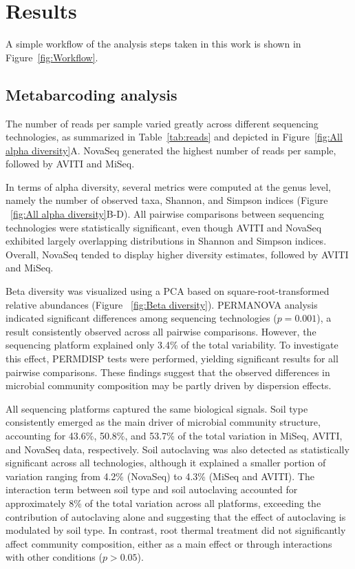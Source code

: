 \documentclass[12pt]{article}
\theoremstyle{thmstyleone}%
\theoremstyle{thmstyletwo}%
\theoremstyle{thmstylethree}%
\begin{document}
\section{Results}\label{sec2}
A simple workflow of the analysis steps taken in this work is shown in Figure~\ref{fig:Workflow}.



\subsection{Metabarcoding analysis}
The number of reads per sample varied greatly across different sequencing technologies, as summarized in Table~\ref{tab:reads} and depicted in Figure~\ref{fig:All alpha diversity}A. NovaSeq generated the highest number of reads per sample, followed by AVITI and MiSeq. 

In terms of alpha diversity, several metrics were computed at the genus level, namely the number of observed taxa, Shannon, and Simpson indices (Figure ~\ref{fig:All alpha diversity}B-D). All pairwise comparisons between sequencing technologies were statistically significant, even though AVITI and NovaSeq exhibited largely overlapping distributions in Shannon and Simpson indices. Overall, NovaSeq tended to display higher diversity estimates, followed by AVITI and MiSeq.

Beta diversity was visualized using a PCA based on square-root-transformed relative abundances (Figure ~\ref{fig:Beta diversity}). PERMANOVA analysis indicated significant differences among sequencing technologies ($p = 0.001$), a result consistently observed across all pairwise comparisons. However, the sequencing platform explained only 3.4\% of the total variability. To investigate this effect, PERMDISP tests were performed, yielding significant results for all pairwise comparisons. These findings suggest that the observed differences in microbial community composition may be partly driven by dispersion effects.

All sequencing platforms captured the same biological signals. Soil type consistently emerged as the main driver of microbial community structure, accounting for 43.6\%, 50.8\%, and 53.7\% of the total variation in MiSeq, AVITI, and NovaSeq data, respectively. Soil autoclaving was also detected as statistically significant across all technologies, although it explained a smaller portion of variation ranging from 4.2\% (NovaSeq) to 4.3\% (MiSeq and AVITI). The interaction term between soil type and soil autoclaving accounted for approximately 8\% of the total variation across all platforms, exceeding the contribution of autoclaving alone and suggesting that the effect of autoclaving is modulated by soil type. In contrast, root thermal treatment did not significantly affect community composition, either as a main effect or through interactions with other conditions ($p > 0.05$).
\end{document}
